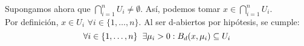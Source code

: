 \documentclass[12pt]{article}
\begin{document}
Supongamos ahora que $\bigcap_{i = 1}^n U_i \neq \emptyset$. Así, podemos tomar $x \in \bigcap_{i = 1}^n U_i$. \\
Por definición, $x \in U_i$ $\forall i \in \{1, \dots, n\}$. Al ser d-abiertos por hipótesis, se cumple: 
$$\forall i \in \{1, \dots, n\} \hspace{2mm} \exists \mu_i > 0 : B_d(x, \mu_i) \subseteq U_i$$
\end{document}
